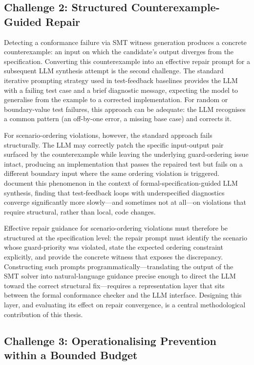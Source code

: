\subsection*{Challenge 2: Structured Counterexample-Guided Repair}

Detecting a conformance failure via SMT witness generation produces a concrete counterexample: an input on which the candidate's output diverges from the specification.  Converting this counterexample into an effective repair prompt for a subsequent LLM synthesis attempt is the second challenge.  The standard iterative prompting strategy used in test-feedback baselines provides the LLM with a failing test case and a brief diagnostic message, expecting the model to generalise from the example to a corrected implementation.  For random or boundary-value test failures, this approach can be adequate: the LLM recognises a common pattern (an off-by-one error, a missing base case) and corrects it.

For scenario-ordering violations, however, the standard approach fails structurally.  The LLM may correctly patch the specific input-output pair surfaced by the counterexample while leaving the underlying guard-ordering issue intact, producing an implementation that passes the repaired test but fails on a different boundary input where the same ordering violation is triggered.  \citet{lynn2024verifierloop} document this phenomenon in the context of formal-specification-guided LLM synthesis, finding that test-feedback loops with underspecified diagnostics converge significantly more slowly—and sometimes not at all—on violations that require structural, rather than local, code changes.

Effective repair guidance for scenario-ordering violations must therefore be structured at the specification level: the repair prompt must identify the scenario whose guard-priority was violated, state the expected ordering constraint explicitly, and provide the concrete witness that exposes the discrepancy.  Constructing such prompts programmatically—translating the output of the SMT solver into natural-language guidance precise enough to direct the LLM toward the correct structural fix—requires a representation layer that sits between the formal conformance checker and the LLM interface.  Designing this layer, and evaluating its effect on repair convergence, is a central methodological contribution of this thesis.

\subsection*{Challenge 3: Operationalising Prevention within a Bounded Budget}

